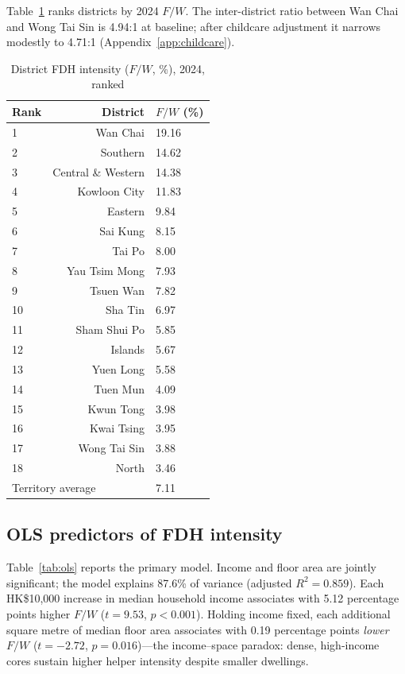 \documentclass[11pt,a4paper]{article}
\begin{document}
Table~\ref{tab:rankings} ranks districts by 2024 $F/W$. The inter-district ratio between Wan Chai and Wong Tai Sin is 4.94:1 at baseline; after childcare adjustment it narrows modestly to 4.71:1 (Appendix~\ref{app:childcare}).

\begin{table}[H]
\centering
\caption{District FDH intensity ($F/W$, \%), 2024, ranked}
\label{tab:rankings}
\begin{tabular}{@{}lrl@{}}
\toprule
Rank & District & $F/W$ (\%) \\
\midrule
1 & Wan Chai & 19.16 \\
2 & Southern & 14.62 \\
3 & Central \& Western & 14.38 \\
4 & Kowloon City & 11.83 \\
5 & Eastern & 9.84 \\
6 & Sai Kung & 8.15 \\
7 & Tai Po & 8.00 \\
8 & Yau Tsim Mong & 7.93 \\
9 & Tsuen Wan & 7.82 \\
10 & Sha Tin & 6.97 \\
11 & Sham Shui Po & 5.85 \\
12 & Islands & 5.67 \\
13 & Yuen Long & 5.58 \\
14 & Tuen Mun & 4.09 \\
15 & Kwun Tong & 3.98 \\
16 & Kwai Tsing & 3.95 \\
17 & Wong Tai Sin & 3.88 \\
18 & North & 3.46 \\
\midrule
\multicolumn{2}{l}{Territory average} & 7.11 \\
\bottomrule
\end{tabular}
\end{table}

\subsection{OLS predictors of FDH intensity}

Table~\ref{tab:ols} reports the primary model. Income and floor area are jointly significant; the model explains 87.6\% of variance (adjusted $R^2{=}0.859$). Each HK\$10{,}000 increase in median household income associates with 5.12 percentage points higher $F/W$ ($t{=}9.53$, $p{<}0.001$). Holding income fixed, each additional square metre of median floor area associates with 0.19 percentage points \emph{lower} $F/W$ ($t{=}{-}2.72$, $p{=}0.016$)---the income--space paradox: dense, high-income cores sustain higher helper intensity despite smaller dwellings.
\end{document}
